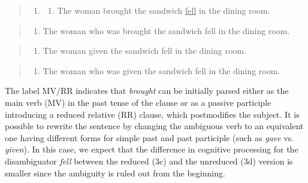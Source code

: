 \documentclass[a4paper, nobind]{templates/ociamthesis}
\providecommand{\tightlist}{%
  \setlength{\itemsep}{0pt}\setlength{\parskip}{0pt}}
\begin{document}
\begin{quote}
\begin{enumerate}
\def\labelenumi{(\arabic{enumi})}
\setcounter{enumi}{2}
\item
  \begin{enumerate}
  \def\labelenumii{\alph{enumii}.}
  \tightlist
  \item
    The woman brought the sandwich \underline{fell} in the dining room. \footnotesize{}
  \end{enumerate}
\end{enumerate}
\end{quote}

\begin{quote}
\begin{enumerate}
\def\labelenumi{\alph{enumi}.}
\setcounter{enumi}{1}
\tightlist
\item
  The woman who was brought the sandwich fell in the dining room. \footnotesize{}
\end{enumerate}
\end{quote}

\begin{quote}
\begin{enumerate}
\def\labelenumi{\alph{enumi}.}
\setcounter{enumi}{2}
\tightlist
\item
  The woman given the sandwich fell in the dining room. \footnotesize{}
\end{enumerate}
\end{quote}

\begin{quote}
\begin{enumerate}
\def\labelenumi{\alph{enumi}.}
\setcounter{enumi}{3}
\tightlist
\item
  The woman who was given the sandwich fell in the dining room. \footnotesize{}
\end{enumerate}
\end{quote}

The label MV/RR indicates that \emph{brought} can be initially parsed either as the main verb (MV) in the past tense of the clause or as a passive participle introducing a reduced relative (RR) clause, which postmodifies the subject. It is possible to rewrite the sentence by changing the ambiguous verb to an equivalent one having different forms for simple past and past participle (such as \emph{gave} vs. \emph{given}). In this case, we expect that the difference in cognitive processing for the disambiguator \emph{fell} between the reduced (3c) and the unreduced (3d) version is smaller since the ambiguity is ruled out from the beginning.
\end{document}
